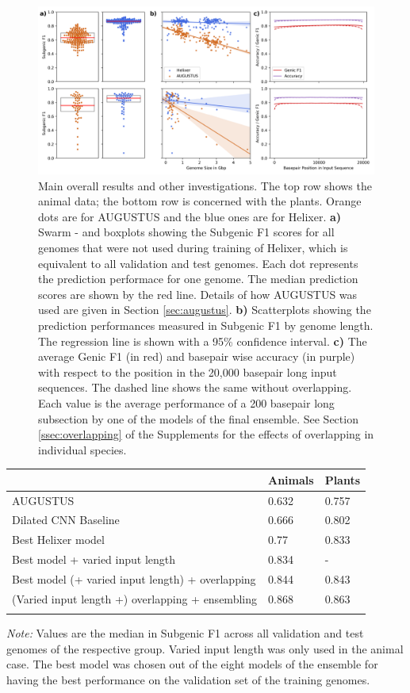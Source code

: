 \documentclass{bioinfo}
\begin{document}
\begin{figure}[!tpb]
\label{fig:main_results}
\centerline{\includegraphics[width=\textwidth]{images/main_results}}
\caption{Main overall results and other investigations. The top row shows the animal
 data; the bottom row is concerned with the plants. Orange dots are for AUGUSTUS and 
the blue ones are for Helixer. {\bf a)} Swarm - and boxplots showing the Subgenic F1 
scores for all genomes that were not used during training of Helixer, which is 
equivalent to all validation and test genomes. Each dot represents the prediction 
performace for one genome. The median prediction scores are shown by the red line. 
Details of how AUGUSTUS was used are given in Section \ref{sec:augustus}. {\bf b)} 
Scatterplots showing the prediction performances measured in Subgenic F1 by genome 
length. The regression line is shown with a 95\% confidence interval. {\bf c)} The 
average Genic F1 (in red) and basepair wise accuracy (in purple) with respect to 
the position in the 20,000 basepair long input sequences. The dashed line shows the 
same without overlapping. Each value is the average performance of a 200 basepair 
long subsection by one of the models of the final ensemble. 
See Section \ref{ssec:overlapping} of the 
Supplements for the effects of overlapping in individual species.}
\end{figure}

\begin{table}[!t]
 {
\begin{tabular}{@{}lll@{}}
\toprule & Animals & Plants\\
\midrule
AUGUSTUS & 0.632 & 0.757 \\
Dilated CNN Baseline & 0.666 &  0.802 \\
Best Helixer model & 0.77  & 0.833  \\
Best model + varied input length & 0.834  & - \\
Best model (+ varied input length) + overlapping &  0.844  & 0.843  \\
(Varied input length +) overlapping + ensembling & 0.868  & 0.863  \\
\botrule
\end{tabular}}{{\it Note:} Values are the median in Subgenic F1 across all 
validation and test genomes of the respective group. Varied input length was only 
used in the animal case. The best model was chosen out of the eight models of the 
ensemble for having the best performance on the validation set of the training genomes.}
\end{table}
\end{document}
